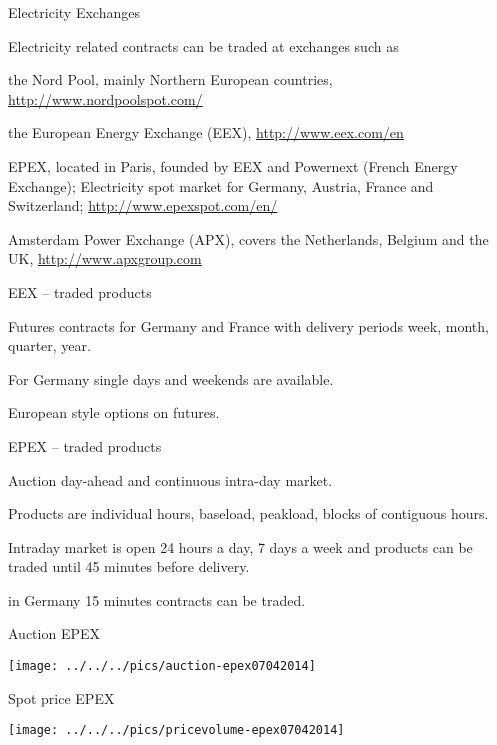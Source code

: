 
{Electricity Exchanges}

Electricity related contracts  can be traded at exchanges such as


	the Nord Pool, mainly Northern European countries, \url{http://www.nordpoolspot.com/}

	the European Energy Exchange (EEX), \url{http://www.eex.com/en}

	EPEX, located in Paris, founded by EEX and Powernext (French Energy Exchange);
Electricity spot market for Germany, Austria, France and Switzerland;
\url{http://www.epexspot.com/en/}

	Amsterdam Power Exchange (APX), covers the Netherlands, Belgium and the UK, \url{http://www.apxgroup.com}


{EEX -- traded products}


	Futures contracts for Germany and France with delivery periods week, month, quarter, year.

	For Germany single days and weekends are available.

	European style options on futures.


{EPEX -- traded products}


	Auction day-ahead and continuous intra-day market.

	Products are individual hours, baseload, peakload, blocks of contiguous hours.

	Intraday market is open 24 hours a day, 7 days a week and products can be traded until 45 minutes before delivery.

	in Germany 15 minutes contracts can be traded.


{Auction EPEX}
\begin{center}
\texttt{[image: ../../../pics/auction-epex07042014]}
\end{center}

{Spot price EPEX}
\begin{center}
\texttt{[image: ../../../pics/pricevolume-epex07042014]}
\end{center}

